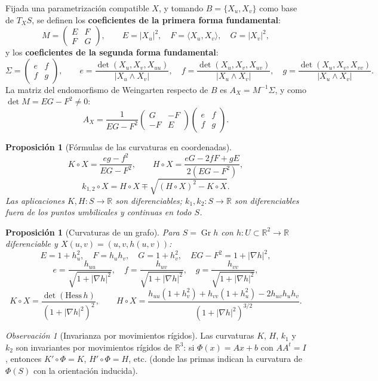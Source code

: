 \documentclass[11pt]{article}
\DeclareMathOperator{\Gr}{Gr}
\theoremstyle{plain}
\newtheorem{proposicion}[teorema]{Proposición}
\theoremstyle{definition}
\theoremstyle{remark}
\newtheorem{observacion}[teorema]{Observación}
\begin{document}
\noindent
Fijada una parametrización compatible $X$, y tomando $B=\{X_u,X_v\}$ como base de $T_XS$, se definen los \textbf{coeficientes de la primera forma fundamental}:
\[
M = \begin{pmatrix} E & F \\ F & G \end{pmatrix}, \qquad E=|X_u|^2,\quad F=\langle X_u,X_v\rangle,\quad G=|X_v|^2,
\]
y los \textbf{coeficientes de la segunda forma fundamental}:
\[
\Sigma = \begin{pmatrix} e & f \\ f & g \end{pmatrix}, \qquad e = \frac{\det(X_u,X_v,X_{uu})}{|X_u\land X_v|},\quad f = \frac{\det(X_u,X_v,X_{uv})}{|X_u\land X_v|},\quad g = \frac{\det(X_u,X_v,X_{vv})}{|X_u\land X_v|}.
\]
La matriz del endomorfismo de Weingarten respecto de $B$ es $A_X = M^{-1}\Sigma$, y como $\det M = EG-F^2\neq 0$:
\[
A_X = \frac{1}{EG-F^2}\begin{pmatrix} G & -F \\ -F & E \end{pmatrix}\begin{pmatrix} e & f \\ f & g \end{pmatrix}.
\]

\begin{proposicion}[Fórmulas de las curvaturas en coordenadas]
\[
K\circ X = \frac{eg-f^2}{EG-F^2}, \qquad H\circ X = \frac{eG-2fF+gE}{2(EG-F^2)},
\]
\[
k_{1,2}\circ X = H\circ X \mp \sqrt{(H\circ X)^2 - K\circ X}.
\]
Las aplicaciones $K,H:S\to\mathbb{R}$ son diferenciables; $k_1,k_2:S\to\mathbb{R}$ son diferenciables fuera de los puntos umbilicales y continuas en todo $S$.
\end{proposicion}

\begin{proposicion}[Curvaturas de un grafo]
Para $S = \Gr h$ con $h:U\subset\mathbb{R}^2\to\mathbb{R}$ diferenciable y $X(u,v)=(u,v,h(u,v))$:
\[
E = 1+h_u^2,\quad F = h_u h_v,\quad G = 1+h_v^2,\quad EG-F^2 = 1+|\nabla h|^2,
\]
\[
e = \frac{h_{uu}}{\sqrt{1+|\nabla h|^2}},\quad f = \frac{h_{uv}}{\sqrt{1+|\nabla h|^2}},\quad g = \frac{h_{vv}}{\sqrt{1+|\nabla h|^2}},
\]
\[
K\circ X = \frac{\det(\mathrm{Hess}\, h)}{(1+|\nabla h|^2)^2}, \qquad H\circ X = \frac{h_{uu}(1+h_v^2)+h_{vv}(1+h_u^2)-2h_{uv}h_uh_v}{(1+|\nabla h|^2)^{3/2}}.
\]
\end{proposicion}

\begin{observacion}[Invarianza por movimientos rígidos]
Las curvaturas $K$, $H$, $k_1$ y $k_2$ son invariantes por movimientos rígidos de $\mathbb{R}^3$: si $\Phi(x)=Ax+b$ con $AA^t=I$, entonces $K'\circ\Phi = K$, $H'\circ\Phi = H$, etc. (donde las primas indican la curvatura de $\Phi(S)$ con la orientación inducida).
\end{observacion}
\end{document}
